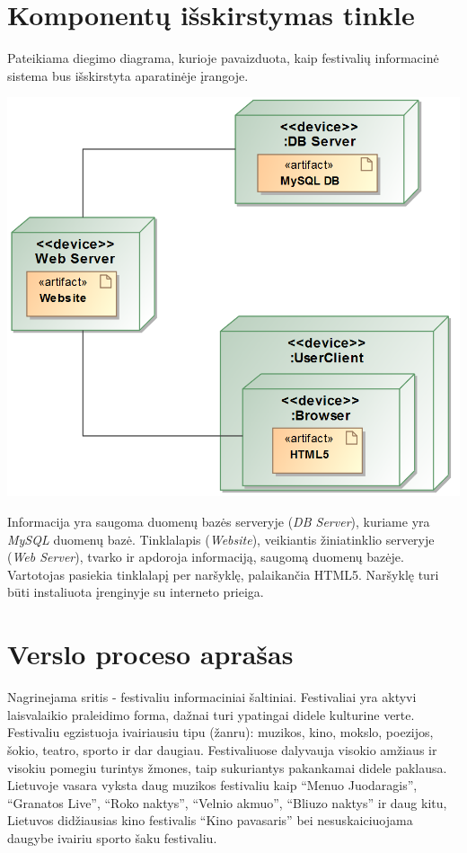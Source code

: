 ﻿\documentclass{VUMIFPSkursinis}
\begin{document}
\section{Komponentų išskirstymas tinkle}
Pateikiama diegimo diagrama, kurioje pavaizduota, kaip festivalių informacinė sistema bus išskirstyta aparatinėje įrangoje. 
\begin{center}
    \includegraphics[scale=0.5]{img/PSI3/deploy.PNG}
\end{center}
Informacija yra saugoma duomenų bazės serveryje (\textit{DB Server}), kuriame yra \textit{MySQL} duomenų bazė. Tinklalapis (\textit{Website}), veikiantis žiniatinklio serveryje (\textit{Web Server}), tvarko ir apdoroja informaciją, saugomą duomenų bazėje. Vartotojas pasiekia tinklalapį per naršyklę, palaikančia HTML5. Naršyklę turi būti instaliuota įrenginyje su interneto prieiga.


\section{Verslo proceso aprašas}

Nagrinejama sritis - festivaliu informaciniai šaltiniai. 
Festivaliai yra aktyvi laisvalaikio praleidimo forma, dažnai turi ypatingai didele kulturine verte. 
Festivaliu egzistuoja ivairiausiu tipu (žanru): muzikos, kino, mokslo, poezijos, šokio, teatro, sporto ir dar daugiau. 
Festivaliuose dalyvauja visokio amžiaus ir visokiu pomegiu turintys žmones, taip sukuriantys pakankamai didele paklausa. 
Lietuvoje vasara vyksta daug muzikos festivaliu kaip “Menuo Juodaragis”, “Granatos Live”, “Roko naktys”, “Velnio akmuo”, “Bliuzo naktys” ir daug kitu,
 Lietuvos didžiausias kino festivalis “Kino pavasaris” bei nesuskaiciuojama daugybe ivairiu sporto šaku festivaliu.
\end{document}
